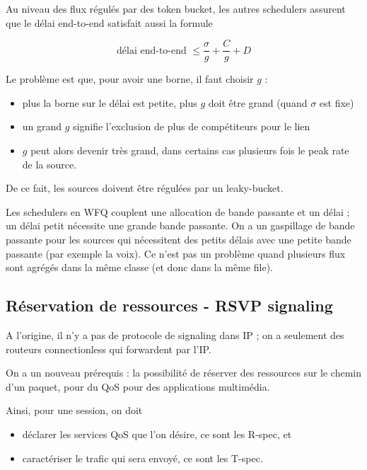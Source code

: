 \documentclass[10pt,a4paper]{report}
\begin{document}
			Au niveau des flux régulés par des token bucket, les autres schedulers assurent que le délai end-to-end satisfait aussi la formule
			
			$$\text{délai end-to-end } \leq \frac{\sigma}{g} + \frac{C}{g} + D$$
		
			Le problème est que, pour avoir une borne, il faut choisir $g$ :
			
			\begin{itemize}
				\item plus la borne sur le délai est petite, plus $g$ doit être grand (quand $\sigma$ est fixe)
				\item un grand $g$ signifie l'exclusion de plus de compétiteurs pour le lien
				\item $g$ peut alors devenir très grand, dans certains cas plusieurs fois le peak rate de la source.
			\end{itemize}
			
			De ce fait, les sources doivent être régulées par un leaky-bucket.
			
			Les schedulers en WFQ couplent une allocation de bande passante et un délai ; un délai petit nécessite une grande bande passante. On a un gaspillage de bande passante pour les sources qui nécessitent des petits délais avec une petite bande passante (par exemple la voix). Ce n'est pas un problème quand plusieurs flux sont agrégés dans la même classe (et donc dans la même file).
		
		
		
		\subsection{Réservation de ressources - RSVP signaling}
		
		A l'origine, il n'y a pas de protocole de signaling dans IP ; on a seulement des routeurs connectionless qui forwardent par  l'IP.
		
		On a un nouveau prérequis : la possibilité de réserver des ressources sur le chemin d'un paquet, pour du QoS pour des applications multimédia.
		
		Ainsi, pour une session, on doit
		
		\begin{itemize}
			\item déclarer les services QoS que l'on désire, ce sont les R-spec, et
			\item caractériser le trafic qui sera envoyé, ce sont les T-spec.
		\end{itemize}
		
\end{document}
